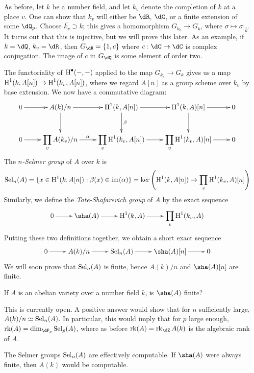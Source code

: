 \documentclass{article}
\begin{document}
As before, let $k$ be a number field, and let $k_v$ denote the completion of 
$k$ at a place $v$. One can show that $k_v$ will either be $\dR$, $\dC$, or a 
finite extension of some $\dQ_p$. Choose $\overline{k_v}\supset k$; this gives 
a homomorphism $G_{k_v} \to G_k$, where $\sigma\mapsto \sigma|_{\bar k}$. It 
turns out that this is injective, but we will prove this later. As an example, 
if $k=\dQ$, $k_v=\dR$, then $G_{\dR}=\{1,c\}$ where $c:\dC\to \dC$ is complex 
conjugation. The image of $c$ in $G_\dQ$ is some element of order two. 

The functoriality of $\operatorname{H}^\bullet(-,-)$ applied to the map $G_{k_v} \to G_k$ 
gives us a map $\operatorname{H}^1(k,A[n]) \to \operatorname{H}^1(k_v,A[n])$, where we regard $A[n]$ as a 
group scheme over $k_v$ by base extension. We now have a commutative diagram: 
\[\xymatrix{
  0 \ar[r] 
    & A(k)/n \ar[r] \ar[d] 
    & \h^1(k,A[n]) \ar[r] \ar[d]^-\beta 
    & \h^1(k,A)[n] \ar[r] \ar[d] 
    & 0 \\
  0 \ar[r] 
    & \displaystyle\prod_v A(k_v)/n \ar[r]^-\alpha 
    & \displaystyle\prod_v \h^1(k_v,A[n]) \ar[r] 
    & \displaystyle\prod_v \h^1(k_v,A)[n] \ar[r] 
    & 0
}\]
The \emph{$n$-Selmer group} of $A$ over $k$ is 
\begin{align*}
  \operatorname{Sel}_n(A) = \{x\in \operatorname{H}^1(k,A[n]) : \beta(x) \in \operatorname{im}(\alpha)\} 
    = \ker\left(\operatorname{H}^1(k,A[n]) \to \prod_v \operatorname{H}^1(k_v,A)[n]\right)
\end{align*}
Similarly, we define the \emph{Tate-Shafarevich group} of $A$ by the exact 
sequence 
\[\xymatrix{
  0 \ar[r] 
    & \sha(A) \ar[r] 
    & \h^1(k,A) \ar[r]
    & \displaystyle\prod_v \h^1(k_v,A)
}\]
Putting these two definitions together, we obtain a short exact 
sequence 
\[\xymatrix{
  0 \ar[r] 
    & A(k)/n \ar[r] 
    & \selmer_n(A) \ar[r] 
    & \sha(A)[n] \ar[r] 
    & 0
}\]
We will soon prove that $\operatorname{Sel}_n(A)$ is finite, hence $A(k)/n$ and 
$\sha(A)[n]$ are finite. 

\begin{question}
If $A$ is an abelian variety over a number field $k$, is $\sha(A)$ finite?
\end{question}
This is currently open. A positive answer would show that for $n$ sufficiently 
large, $A(k)/n \simeq \operatorname{Sel}_n(A)$. In particular, this would imply that for $p$ 
large enough, $\rank(A) = \dim_{\dF_p} \selmer_p(A)$, where as before 
$\rank(A) = \rank_\dZ A(k)$ is the algebraic rank of 
$A$. 

\begin{remark}
The Selmer groups $\operatorname{Sel}_n(A)$ are effectively computable. If $\sha(A)$ were 
always finite, then $A(k)$ would be computable. 
\end{remark}
\end{document}
